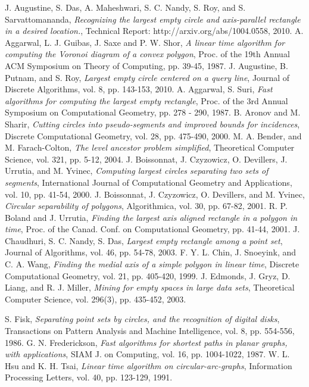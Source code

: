 \documentclass[12pt]{llncs}
\begin{document}
\begin{thebibliography}{88}
 J. Augustine, S. Das, A. Maheshwari, S. C. Nandy,
S. Roy, and S. Sarvattomananda, {\it Recognizing the largest empty circle and
axis-parallel rectangle in a desired location.}, {\sf Technical Report:
http://arxiv.org/abs/1004.0558}, 2010.
 A. Aggarwal, L. J. Guibas, J. Saxe and P. W. Shor, {\it
A linear time algorithm for computing the Voronoi diagram of a convex
polygon}, Proc. of the {\sf 19th Annual ACM Symposium on Theory of
Computing}, pp. 39-45, 1987.
 J. Augustine, B. Putnam, and S. Roy, {\it Largest
empty circle centered on a query line}, {\sf Journal of Discrete
Algorithms}, vol. 8, pp. 143-153, 2010.
 A. Aggarwal, S. Suri, {\it Fast algorithms for computing
the largest empty rectangle}, Proc. of the {\sf 3rd Annual Symposium
on Computational Geometry}, pp. 278 - 290, 1987. 
 B. Aronov and M. Sharir, {\it Cutting circles into
pseudo-segments and improved bounds for incidences}, {\sf Discrete
Computational Geometry}, vol. 28, pp. 475-490, 2000.
 M. A. Bender, and M. Farach-Colton, {\it The level
ancestor problem simplified}, {\sf Theoretical Computer Science},
vol. 321, pp. 5-12, 2004. 
 J. Boissonnat, J. Czyzowicz, O. Devillers,
J. Urrutia, and M. Yvinec, {\it Computing largest circles
separating two sets of segments}, {\sf International Journal of  
Computational Geometry and Applications}, vol. 10, pp. 41-54, 2000.
 J. Boissonnat, J. Czyzowicz, O. Devillers, and
M. Yvinec, {\it Circular separability of polygons}, {\sf Algorithmica},
 vol. 30, pp. 67-82, 2001.
 R. P. Boland and J. Urrutia, {\it Finding the largest
axis aligned rectangle in a polygon in  time}, Proc.
of the {\sf Canad. Conf. on Computational Geometry}, pp. 41-44, 2001.
 J. Chaudhuri, S. C. Nandy, S. Das, {\it Largest empty
rectangle among a point set}, {\sf  Journal of  Algorithms}, vol. 46,
pp. 54-78, 2003.
 F. Y. L. Chin, J. Snoeyink, and C. A. Wang, {\it
Finding the medial axis of a simple polygon in linear time}, {\sf
Discrete Computational Geometry}, vol. 21, pp. 405-420, 1999.
 J. Edmonds, J. Gryz, D. Liang, and R. J. 
Miller, {\it Mining for empty spaces in large data sets}, 
{\sf Theoretical Computer Science}, vol. 296(3), pp. 435-452, 2003. 

 S. Fisk, { \it Separating point sets by circles, and the
recognition of digital disks}, {\sf Transactions on Pattern Analysis and Machine
Intelligence}, vol. 8, pp. 554-556, 1986.
 G. N. Frederickson, {\it Fast algorithms for shortest 
paths in planar graphs, with applications}, {\sf SIAM J. on Computing}, 
vol. 16, pp. 1004-1022, 1987.
 W. L. Hsu and K. H. Tsai, {\it Linear time algorithm
on circular-arc-graphs}, {\sf Information Processing Letters}, vol.
40, pp. 123-129, 1991.



\end{thebibliography}
\end{document}
